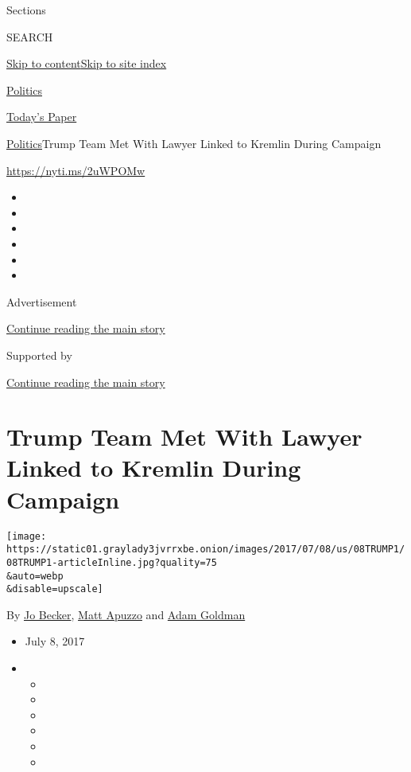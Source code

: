 Sections

SEARCH

\protect\hyperlink{site-content}{Skip to
content}\protect\hyperlink{site-index}{Skip to site index}

\href{https://www.nytimes3xbfgragh.onion/section/politics}{Politics}

\href{https://myaccount.nytimes3xbfgragh.onion/auth/login?response_type=cookie\&client_id=vi}{}

\href{https://www.nytimes3xbfgragh.onion/section/todayspaper}{Today's
Paper}

\href{/section/politics}{Politics}\textbar{}Trump Team Met With Lawyer
Linked to Kremlin During Campaign

\url{https://nyti.ms/2uWPOMw}

\begin{itemize}
\item
\item
\item
\item
\item
\item
\end{itemize}

Advertisement

\protect\hyperlink{after-top}{Continue reading the main story}

Supported by

\protect\hyperlink{after-sponsor}{Continue reading the main story}

\hypertarget{trump-team-met-with-lawyer-linked-to-kremlin-during-campaign}{%
\section{Trump Team Met With Lawyer Linked to Kremlin During
Campaign}\label{trump-team-met-with-lawyer-linked-to-kremlin-during-campaign}}

\texttt{[image: https://static01.graylady3jvrrxbe.onion/images/2017/07/08/us/08TRUMP1/08TRUMP1-articleInline.jpg?quality=75\\\&auto=webp\\\&disable=upscale]}

By \href{http://www.nytimes3xbfgragh.onion/by/jo-becker}{Jo Becker},
\href{http://www.nytimes3xbfgragh.onion/by/matt-apuzzo}{Matt Apuzzo} and
\href{https://www.nytimes3xbfgragh.onion/by/adam-goldman}{Adam Goldman}

\begin{itemize}
\item
  July 8, 2017
\item
  \begin{itemize}
  \item
  \item
  \item
  \item
  \item
  \item
  \end{itemize}
\end{itemize}

